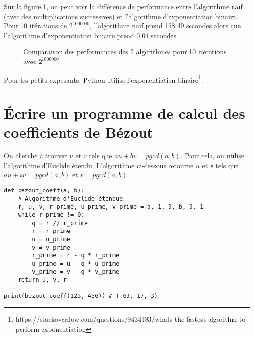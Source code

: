 Sur la figure \ref{fig:perf_exp_rapide}, on peut voir la différence de performance entre l'algorithme naïf (avec des multiplications successives) et l'algorithme d'exponentiation
binaire. Pour 10 itérations de $2^{1000000}$, l'algorithme naïf prend 168.49 secondes alors que l'algorithme d'exponentiation binaire prend 0.04 secondes. \\

\begin{figure}[H]
\centering
\caption{Comparaison des performances des 2 algorithmes pour 10 itérations avec $2^{1000000}$} \label{fig:perf_exp_rapide}
\end{figure}

Pour les petits exposants, Python utilise l'exponentiation binaire\footnote{https://stackoverflow.com/questions/9434183/whats-the-fastest-algorithm-to-perform-exponentiation}.

\section{Écrire un programme de calcul des coefficients de Bézout}

On cherche à trouver $u$ et $v$ tels que $au + bv = pgcd(a,b)$. Pour cela, on utilise l'algorithme d'Euclide étendu. L'algorithme ci-dessous retourne $u$ et $v$ tels que $au + bv = pgcd(a,b)$ et $r = pgcd(a,b)$. \\

\begin{tcolorbox}[
    enhanced,
    attach boxed title to top left={xshift=6mm,yshift=-3mm},
    colback=lightgreen!20,
    colframe=lightgreen,
    colbacktitle=lightgreen,
    title=Calcul des coefficients de Bézout,
    fonttitle=\bfseries\color{black},
    boxed title style={size=small,colframe=lightgreen,sharp corners},
    sharp corners,
]    
    \begin{verbatim}
def bezout_coeff(a, b):
    # Algorithme d'Euclide étendue
    r, u, v, r_prime, u_prime, v_prime = a, 1, 0, b, 0, 1
    while r_prime != 0:
        q = r // r_prime
        r = r_prime
        u = u_prime
        v = v_prime
        r_prime = r - q * r_prime
        u_prime = u - q * u_prime
        v_prime = v - q * v_prime
    return u, v, r

print(bezout_coeff(123, 456)) # (-63, 17, 3)
    \end{verbatim}
\end{tcolorbox}

